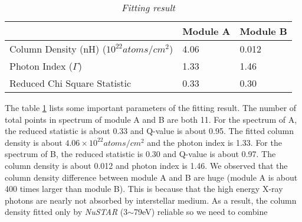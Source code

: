 \documentclass[12pt]{report}
\newcommand{\mycaption}[1]{\caption{\textit{\footnotesize #1}}}
\begin{document}
        \begin{table}[!h] 
          \centering
          \begin{tabular}{| m{4cm} | m{3cm} | m{3cm} |}
            \hline
            & Module A & Module B \\
            \hline
            Column Density (nH) ($10^{22} atoms/cm^2$) & 4.06 & 0.012\\ 
            \hline
            Photon Index ($\Gamma$) & 1.33 & 1.46 \\
            \hline 
            Reduced Chi Square Statistic & 0.33 & 0.30 \\
            \hline 
          \end{tabular}
          \mycaption{Fitting result  }
          \label{table:parameter_1}
        \end{table}

        \indent
        The table \ref{table:parameter_1} lists some important parameters of the fitting result. 
        The number of total points in spectrum of module A and B are both 11. For the spectrum of A, the 
        reduced statistic is about 0.33 and Q-value is about 0.95. The fitted column density is about 
        $4.06\times 10^{22} atoms/cm^2$ and the photon index is 1.33. For the spectrum of B, the reduced statistic is
        0.30 and Q-value is about 0.97. The column density is about 0.012 and photon index is 1.46. We observed that
        the column density difference between module A and B are huge (module A is about 400 times larger than 
        module B). This 
        is because that the high energy X-ray photons are nearly not absorbed by interstellar medium. As a result, 
        the column density fitted only by \textit{NuSTAR} (3$\sim$79eV) reliable so we need to combine 
\end{document}
